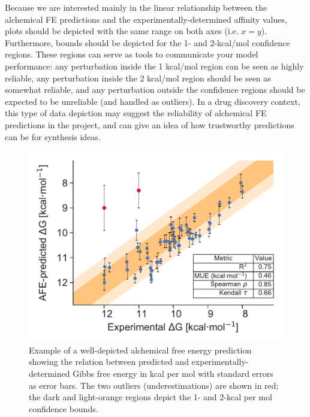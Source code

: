 \documentclass[9pt,bestpractices]{livecoms}
\begin{document}
Because we are interested mainly in the linear relationship between the alchemical FE predictions and the experimentally-determined affinity values, plots should be depicted with the same range on both axes (i.e. $x=y$). Furthermore, bounds should be depicted for the 1- and 2-kcal/mol confidence regions. These regions can serve as tools to communicate your model performance: any perturbation inside the 1 kcal/mol region can be seen as highly reliable, any perturbation inside the 2 kcal/mol region should be seen as somewhat reliable, and any perturbation outside the confidence regions should be expected to be unreliable (and handled as outliers). In a drug discovery context, this type of data depiction may suggest the reliability of alchemical FE predictions in the project, and can give an idea of how trustworthy predictions can be for synthesis ideas. 
\begin{figure}
    \includegraphics[width=0.95\linewidth]{paper/figures/fig13_analysis_practices/Figure.pdf}
    \caption{Example of a well-depicted alchemical free energy prediction showing the relation between predicted and experimentally-determined Gibbs free energy in kcal per mol with standard errors as error bars. The two outliers (underestimations) are shown in red; the dark and light-orange regions depict the 1- and 2-kcal per mol confidence bounds.}
    \label{fig:scatterplot_analysis}
\end{figure}
\end{document}
